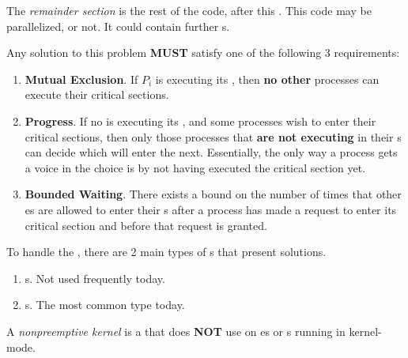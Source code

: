 \begin{definition}\label{def:Remainder_Section}
  The \emph{remainder section} is the rest of the code, after this .
  This code may be parallelized, or not.
  It could contain further s.
\end{definition}

Any solution to this problem \textbf{MUST} satisfy one of the following 3 requirements:
\begin{enumerate}[noitemsep]
\item \textbf{Mutual Exclusion}.
  If  $P_{i}$ is executing its , then \textbf{no other} processes can execute their critical sections.
\item \textbf{Progress}.
  If no  is executing its , and some processes wish to enter their critical sections, then only those processes that \textbf{are not executing} in their s can decide which will enter the  next.
  Essentially, the only way a process gets a voice in the choice is by not having executed the critical section yet.
\item \textbf{Bounded Waiting}.
  There exists a bound on the number of times that other es are allowed to enter their s after a process has made a request to enter its critical section and before that request is granted.
\end{enumerate}

To handle the , there are 2 main types of s that present solutions.
\begin{enumerate}[noitemsep]
\item {}s. Not used frequently today.
\item {}s. The most common type today.
\end{enumerate}

\begin{definition}\label{def:Nonpreemptive_Kernel}
  A \emph{nonpreemptive kernel} is a  that does \textbf{NOT} use  on es or s running in kernel-mode.
\end{definition}

